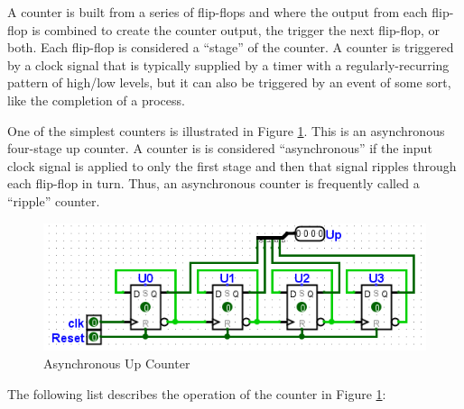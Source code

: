 A counter is built from a series of flip-flops and where the output from each flip-flop is combined to create the counter output, the trigger the next flip-flop, or both. Each flip-flop is considered a ``stage'' of the counter. A counter is triggered by a clock signal that is typically supplied by a timer with a regularly-recurring pattern of high/low levels, but it can also be triggered by an event of some sort, like the completion of a process.

One of the simplest counters is illustrated in Figure \ref{fig:06-01}. This is an asynchronous four-stage up counter. A counter is is considered ``asynchronous'' if the input clock signal is applied to only the first stage and then that signal ripples through each flip-flop in turn. Thus, an asynchronous counter is frequently called a ``ripple'' counter.

\begin{figure}[H]
	\centering
	\includegraphics[width=\maxwidth{.95\linewidth}]{gfx/06-01}
	\caption{Asynchronous Up Counter}
	\label{fig:06-01}
\end{figure}

The following list describes the operation of the counter in Figure \ref{fig:06-01}:

